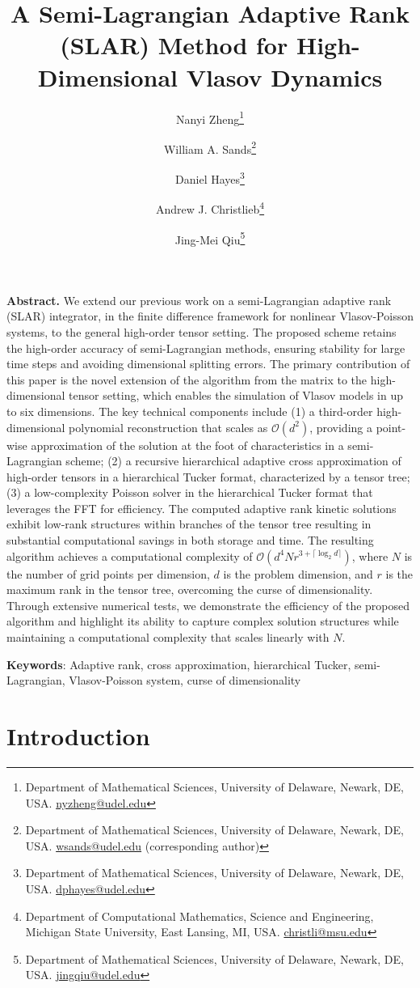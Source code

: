 \documentclass{article}
\title{A Semi-Lagrangian Adaptive Rank (SLAR) Method for High-Dimensional Vlasov Dynamics}
\author{
  Nanyi Zheng\thanks{Department of Mathematical Sciences, University of Delaware, Newark, DE, USA.
  \href{mailto:nyzheng@udel.edu}{nyzheng@udel.edu}}
  \and
  William A. Sands\thanks{Department of Mathematical Sciences, University of Delaware, Newark, DE, USA.
  \href{mailto:wsands@udel.edu}{wsands@udel.edu} (corresponding author)}
  \and
  Daniel Hayes\thanks{Department of Mathematical Sciences, University of Delaware, Newark, DE, USA.
  \href{mailto:dphayes@udel.edu}{dphayes@udel.edu}}
  \and
  Andrew J. Christlieb\thanks{Department of Computational Mathematics, Science and Engineering,
  Michigan State University, East Lansing, MI, USA.
  \href{mailto:christli@msu.edu}{christli@msu.edu}}
  \and
  Jing-Mei Qiu\thanks{Department of Mathematical Sciences, University of Delaware, Newark, DE, USA.
  \href{mailto:jingqiu@udel.edu}{jingqiu@udel.edu}}
}
\date{}
\theoremstyle{plain}
\theoremstyle{definition}
\theoremstyle{remark}
\begin{document}
\maketitle

\bigskip
\noindent
{\bf Abstract.} 
We extend our previous work on a semi-Lagrangian adaptive rank (SLAR) integrator, in the finite difference framework for nonlinear Vlasov-Poisson systems, to the general high-order tensor setting. The proposed scheme retains the high-order accuracy of semi-Lagrangian methods, ensuring stability for large time steps and avoiding dimensional splitting errors.
The primary contribution of this paper is the novel extension of the algorithm from the matrix to the high-dimensional tensor setting, which enables the simulation of Vlasov models in up to six dimensions. The key technical components include (1) a third-order high-dimensional polynomial reconstruction that scales as $\mathcal{O}(d^2)$, providing a point-wise approximation of the solution at the foot of characteristics in a semi-Lagrangian scheme; (2) a recursive hierarchical adaptive cross approximation of high-order tensors in a hierarchical Tucker format, characterized by a tensor tree; (3) a low-complexity Poisson solver in the hierarchical Tucker format that leverages the FFT for efficiency. The computed adaptive rank kinetic solutions exhibit low-rank structures within branches of the tensor tree resulting in substantial computational savings in both storage and time. The resulting algorithm achieves a computational complexity of $\mathcal{O}(d^4 N r^{3+\lceil\log_2d\rceil})$, where $N$ is the number of grid points per dimension, $d$ is the problem dimension, and $r$ is the maximum rank in the tensor tree, overcoming the curse of dimensionality. Through extensive numerical tests, we demonstrate the efficiency of the proposed algorithm and highlight its ability to capture complex solution structures while maintaining a computational complexity that scales linearly with $N$.

{\bf Keywords}: Adaptive rank, cross approximation,  hierarchical Tucker, semi-Lagrangian, Vlasov-Poisson system, curse of dimensionality

\section{Introduction}
\label{sec:Intro}
\end{document}
